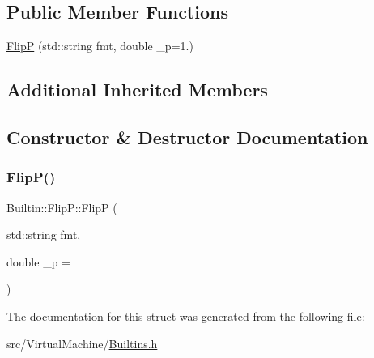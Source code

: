 \subsection*{Public Member Functions}
\begin{DoxyCompactItemize}
\item 
\hyperlink{struct_builtin_1_1_flip_p_adab32b985984688bb906fef95301c7fa}{FlipP} (std\+::string fmt, double \+\_\+p=1.)
\end{DoxyCompactItemize}
\subsection*{Additional Inherited Members}


\subsection{Constructor \& Destructor Documentation}
\mbox{\label{struct_builtin_1_1_flip_p_adab32b985984688bb906fef95301c7fa}} 
\subsubsection{\texorpdfstring{Flip\+P()}{FlipP()}}
{\footnotesize\ttfamily Builtin\+::\+Flip\+P\+::\+FlipP (\begin{DoxyParamCaption}\item[{std\+::string}]{fmt,  }\item[{double}]{\+\_\+p = {} }\end{DoxyParamCaption})\hspace{0.3cm}{\ttfamily [inline]}}



The documentation for this struct was generated from the following file\+:\begin{DoxyCompactItemize}
\item 
src/\+Virtual\+Machine/\hyperlink{_builtins_8h}{Builtins.\+h}\end{DoxyCompactItemize}
